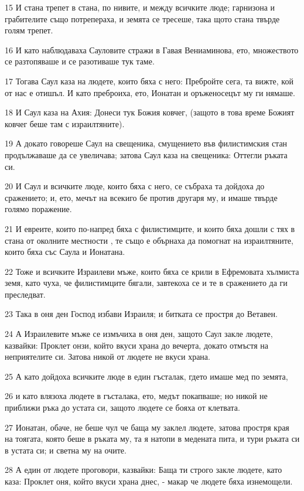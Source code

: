 \par 15 И стана трепет в стана, по нивите, и между всичките люде; гарнизона и грабителите също потрепераха, и земята се тресеше, така щото стана твърде голям трепет.
\par 16 И като наблюдаваха Сауловите стражи в Гавая Вениаминова, ето, множеството се разтопяваше и се разотиваше тук таме.
\par 17 Тогава Саул каза на людете, които бяха с него: Пребройте сега, та вижте, кой от нас е отишъл. И като преброиха, ето, Ионатан и оръженосецът му ги нямаше.
\par 18 И Саул каза на Ахия: Донеси тук Божия ковчег, (защото в това време Божият ковчег беше там с израилтяните).
\par 19 А докато говореше Саул на свещеника, смущението във филистимския стан продължаваше да се увеличава; затова Саул каза на свещеника: Оттегли ръката си.
\par 20 И Саул и всичките люде, които бяха с него, се събраха та дойдоха до сражението; и, ето, мечът на всекиго бе против другаря му, и имаше твърде голямо поражение.
\par 21 И евреите, които по-напред бяха с филистимците, и които бяха дошли с тях в стана от околните местности , те също е обърнаха да помогнат на израилтяните, които бяха със Саула и Ионатана.
\par 22 Тоже и всичките Израилеви мъже, които бяха се крили в Ефремовата хълмиста земя, като чуха, че филистимците бягали, завтекоха се и те в сражението да ги преследват.
\par 23 Така в оня ден Господ избави Израиля; и битката се простря до Ветавен.
\par 24 А Израилевите мъже се измъчиха в оня ден, защото Саул закле людете, казвайки: Проклет онзи, който вкуси храна до вечерта, докато отмъстя на неприятелите си. Затова никой от людете не вкуси храна.
\par 25 А като дойдоха всичките люде в един гъсталак, гдето имаше мед по земята,
\par 26 и като влязоха людете в гъсталака, ето, медът покапваше; но никой не приближи ръка до устата си, защото людете се бояха от клетвата.
\par 27 Ионатан, обаче, не беше чул че баща му заклел людете, затова простря края на тоягата, която беше в ръката му, та я натопи в медената пита, и тури ръката си в устата си; и светна му на очите.
\par 28 А един от людете проговори, казвайки: Баща ти строго закле людете, като каза: Проклет оня, който вкуси храна днес, - макар че людете бяха изнемощели.
